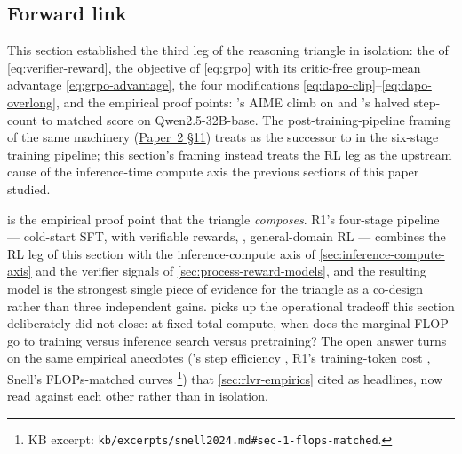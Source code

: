 \subsection{Forward link}
\label{sec:rlvr-forward}

This section established the third leg of the reasoning triangle in
isolation: the  of \cref{eq:verifier-reward}, the
 objective of \cref{eq:grpo} with its critic-free group-mean
advantage \cref{eq:grpo-advantage}, the four  modifications
\cref{eq:dapo-clip}--\cref{eq:dapo-overlong}, and the empirical proof
points: 's AIME climb on  and 's halved step-count to
matched score on Qwen2.5-32B-base. The post-training-pipeline framing
of the same machinery (\hyperref[P2-sec:rlvr-grpo]{Paper~2 §11}) treats  as the successor to
 in the six-stage training pipeline; this section's framing instead
treats the RL leg as the upstream cause of the inference-time compute
axis the previous sections of this paper studied.

 is the empirical proof point that the triangle
\emph{composes}. R1's four-stage pipeline --- cold-start SFT,  with
verifiable rewards, , general-domain RL ---
combines the RL leg of this section with the inference-compute axis
of \cref{sec:inference-compute-axis} and the verifier signals of
\cref{sec:process-reward-models}, and the resulting model is the
strongest single piece of evidence for the triangle as a co-design
rather than three independent gains.  picks up
the operational tradeoff this section deliberately did not close: at
fixed total compute, when does the marginal FLOP go to  training
versus inference search versus pretraining? The open answer turns on
the same empirical anecdotes ('s step efficiency \citep[\S
4]{dapo2025}, R1's training-token cost \citep[\S 2.3]{deepseek-r1},
Snell's FLOPs-matched curves \citep[\S 6]{snell2024}\footnote{KB
excerpt: \texttt{kb/excerpts/snell2024.md\#sec-1-flops-matched}.}) that
\cref{sec:rlvr-empirics} cited as headlines, now read against each
other rather than in isolation.
